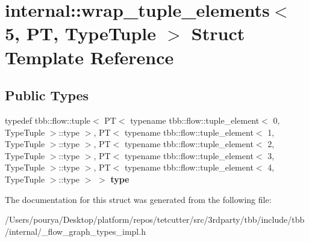 \hypertarget{structinternal_1_1wrap__tuple__elements_3_015_00_01PT_00_01TypeTuple_01_4}{}\section{internal\+:\+:wrap\+\_\+tuple\+\_\+elements$<$ 5, P\+T, Type\+Tuple $>$ Struct Template Reference}
\label{structinternal_1_1wrap__tuple__elements_3_015_00_01PT_00_01TypeTuple_01_4}
\subsection*{Public Types}
\begin{DoxyCompactItemize}
\item 
\hypertarget{structinternal_1_1wrap__tuple__elements_3_015_00_01PT_00_01TypeTuple_01_4_a4ce40be61d75d225a14e2279c0121b1d}{}typedef tbb\+::flow\+::tuple$<$ P\+T$<$ typename tbb\+::flow\+::tuple\+\_\+element$<$ 0, Type\+Tuple $>$\+::type $>$, P\+T$<$ typename tbb\+::flow\+::tuple\+\_\+element$<$ 1, Type\+Tuple $>$\+::type $>$, P\+T$<$ typename tbb\+::flow\+::tuple\+\_\+element$<$ 2, Type\+Tuple $>$\+::type $>$, P\+T$<$ typename tbb\+::flow\+::tuple\+\_\+element$<$ 3, Type\+Tuple $>$\+::type $>$, P\+T$<$ typename tbb\+::flow\+::tuple\+\_\+element$<$ 4, Type\+Tuple $>$\+::type $>$ $>$ {\bfseries type}\label{structinternal_1_1wrap__tuple__elements_3_015_00_01PT_00_01TypeTuple_01_4_a4ce40be61d75d225a14e2279c0121b1d}

\end{DoxyCompactItemize}


The documentation for this struct was generated from the following file\+:\begin{DoxyCompactItemize}
\item 
/\+Users/pourya/\+Desktop/platform/repos/tetcutter/src/3rdparty/tbb/include/tbb/internal/\+\_\+flow\+\_\+graph\+\_\+types\+\_\+impl.\+h\end{DoxyCompactItemize}
